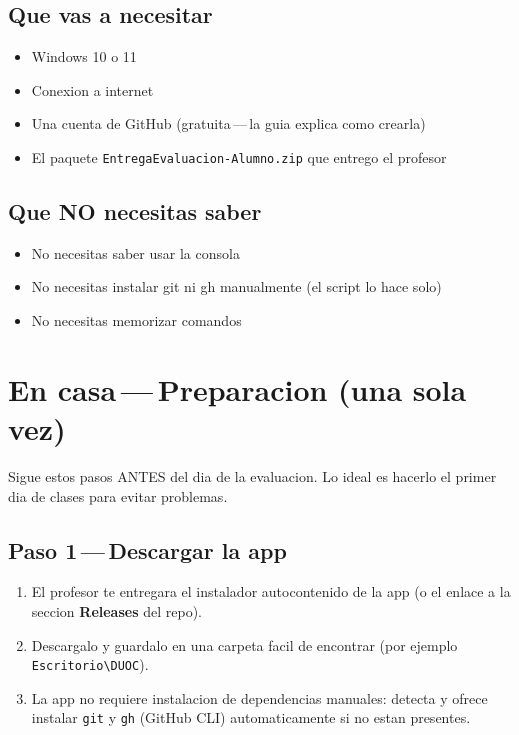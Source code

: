 \documentclass[11pt,a4paper,oneside]{report}
\begin{document}
\section{Que vas a necesitar}

\begin{itemize}
  \item Windows 10 o 11
  \item Conexion a internet
  \item Una cuenta de GitHub (gratuita\,---\,la guia explica como crearla)
  \item El paquete \texttt{EntregaEvaluacion-Alumno.zip} que entrego el profesor
\end{itemize}

\section{Que NO necesitas saber}

\begin{itemize}
  \item No necesitas saber usar la consola
  \item No necesitas instalar git ni gh manualmente (el script lo hace solo)
  \item No necesitas memorizar comandos
\end{itemize}

\chapter{En casa\,---\,Preparacion (una sola vez)}

Sigue estos pasos ANTES del dia de la evaluacion. Lo ideal es hacerlo el primer dia de clases para evitar problemas.

\section{Paso 1\,---\,Descargar la app}

\begin{enumerate}
  \item El profesor te entregara el instalador autocontenido de la app (o el enlace a la seccion \textbf{Releases} del repo).
  \item Descargalo y guardalo en una carpeta facil de encontrar (por ejemplo \texttt{Escritorio\textbackslash{}DUOC}).
  \item La app no requiere instalacion de dependencias manuales: detecta y ofrece instalar \texttt{git} y \texttt{gh} (GitHub CLI) automaticamente si no estan presentes.
\end{enumerate}
\end{document}
